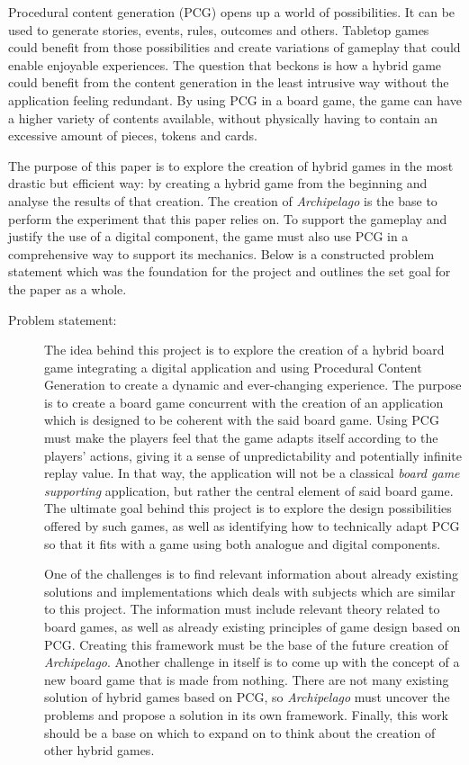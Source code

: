 Procedural content generation (PCG) opens up a world of possibilities. It can be used to generate stories, events, rules, outcomes and others. Tabletop games could benefit from those possibilities and create variations of gameplay that could enable enjoyable experiences. The question that beckons is how a hybrid game could benefit from the content generation in the least intrusive way without the application feeling redundant. By using PCG in a board game, the game can have a higher variety of contents available, without physically having to contain an excessive amount of pieces, tokens and cards. 

The purpose of this paper is to explore the creation of hybrid games in the most drastic but efficient way: by creating a hybrid game from the beginning and analyse the results of that creation. The creation of \textit{Archipelago} is the base to perform the experiment that this paper relies on. To support the gameplay and justify the use of a digital component, the game must also use PCG in a comprehensive way to support its mechanics. Below is a constructed problem statement which was the foundation for the project and outlines the set goal for the paper as a whole.

\begin{description}
\item[Problem statement:]

The idea behind this project is to explore the creation of a hybrid board game integrating a digital application and using Procedural Content Generation to create a dynamic and ever-changing experience. The purpose is to create a board game concurrent with the creation of an application which is designed to be coherent with the said board game. Using PCG must make the players feel that the game adapts itself according to the players' actions, giving it a sense of unpredictability and potentially infinite replay value. In that way, the application will not be a classical \textit{board game supporting} application, but rather the central element of said board game. The ultimate goal behind this project is to explore the design possibilities offered by such games, as well as identifying how to technically adapt PCG so that it fits with a game using both analogue and digital components.

One of the challenges is to find relevant information about already existing solutions and implementations which deals with subjects which are similar to this project. The information must include relevant theory related to board games, as well as already existing principles of game design based on PCG. Creating this framework must be the base of the future creation of \textit{Archipelago}. Another challenge in itself is to come up with the concept of a new board game that is made from nothing. There are not many existing solution of hybrid games based on PCG, so \textit{Archipelago} must uncover the problems and propose a solution in its own framework. Finally, this work should be a base on which to expand on to think about the creation of other hybrid games. 
\end{description}

